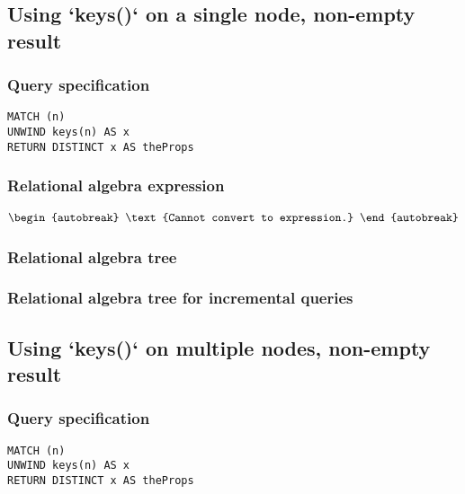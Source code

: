 \subsection{Using `keys()` on a single node, non-empty result}

\subsubsection*{Query specification}

\begin{lstlisting}
MATCH (n)
UNWIND keys(n) AS x
RETURN DISTINCT x AS theProps
\end{lstlisting}

\subsubsection*{Relational algebra expression}

\begin{align*}
\begin{autobreak}
\text{Cannot convert to expression.}
\end{autobreak}
\end{align*}

\subsubsection*{Relational algebra tree}


\subsubsection*{Relational algebra tree for incremental queries}


\subsection{Using `keys()` on multiple nodes, non-empty result}

\subsubsection*{Query specification}

\begin{lstlisting}
MATCH (n)
UNWIND keys(n) AS x
RETURN DISTINCT x AS theProps
\end{lstlisting}


